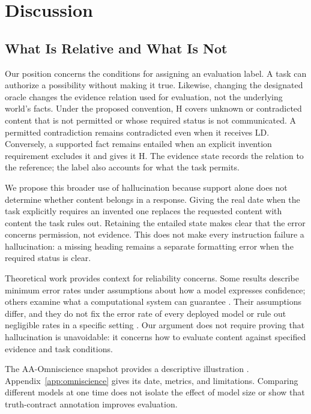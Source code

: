 \documentclass{clv2025}
\begin{document}
\section{Discussion}\label{sec:discussion}

\subsection{What Is Relative and What Is Not}\label{subsec:relative}

Our position concerns the conditions for assigning an evaluation label.
A task can authorize a possibility without making it true. Likewise,
changing the designated oracle changes the evidence relation used for
evaluation, not the underlying world's facts. Under the proposed convention,
H covers unknown or contradicted content that is not permitted or whose
required status is not communicated. A permitted contradiction remains
contradicted even when it receives LD. Conversely, a supported fact remains
entailed when an explicit invention requirement excludes it and gives it H.
The evidence state records the relation to the reference; the label also
accounts for what the task permits.

We propose this broader use of hallucination because support alone does
not determine whether content belongs in a response. Giving the real date
when the task explicitly requires an invented one replaces the requested
content with content the task rules out. Retaining the entailed state
makes clear that the error concerns permission, not evidence. This does
not make every instruction failure a hallucination: a missing heading
remains a separate formatting error when the required status is clear.

Theoretical work provides context for reliability concerns. Some results
describe minimum error rates under assumptions about how a model expresses
confidence; others examine what a computational system can guarantee
\citep{kalai_calibrated_2024,xu_hallucination_2024,banerjee_llms_2024}.
Their assumptions differ, and they do not fix the error rate of every
deployed model or rule out negligible rates in a specific setting
\citep{suzuki_negligible_2025}. Our argument does not require proving that
hallucination is unavoidable: it concerns how to evaluate content against
specified evidence and task conditions.

The AA-Omniscience snapshot provides a descriptive
illustration \citep{jackson_aaomniscience_2025,artificialanalysis_omniscience_leaderboard_2026}.
Appendix~\ref{app:omniscience} gives its date, metrics, and limitations.
Comparing different models at one time does not isolate the effect of model
size or show that truth-contract annotation improves evaluation.
\end{document}
